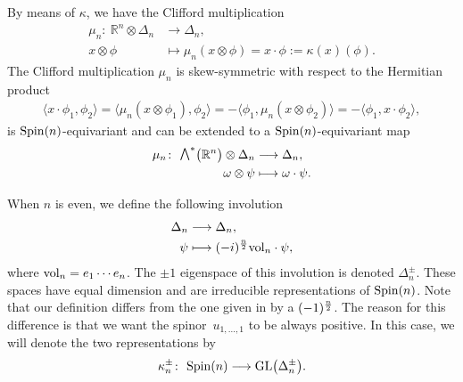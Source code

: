\documentclass[10pt,a4paper]{amsart}
\newcommand{\ext}{\raise1pt\hbox{$\textstyle\bigwedge$}}
\newcommand{\vol}{\mbox{\rm vol}}
\numberwithin{equation}{section}
\begin{document}
By means of $\kappa$, we have the Clif\/ford multiplication
\begin{align*}
\mu_n\colon \ \mathbb{R}^n\otimes \Delta_n &\longrightarrow\Delta_n, \\
x \otimes \phi &\longmapsto \mu_n(x\otimes \phi)=x\cdot\phi :=\kappa(x)(\phi) .
\end{align*}
The Clif\/ford multiplication $\mu_n$ is skew-symmetric with respect to the Hermitian product
\begin{gather*}
\langle x\cdot\phi_1 , \phi_2\rangle =\langle \mu_n(x\otimes \phi_1) , \phi_2\rangle =-\langle \phi_1 , \mu_n(x\otimes \phi_2)\rangle =-\langle \phi_1 , x\cdot \phi_2\rangle,
\end{gather*}
is ${\rm Spin}(n)$-equivariant and can be extended to a ${\rm Spin}(n)$-equivariant map
\begin{align*}
\mu_n\colon \ \ext^*\big(\mathbb{R}^n\big)\otimes \Delta_n &\longrightarrow\Delta_n,\\
\omega \otimes \psi &\longmapsto \omega\cdot\psi.
\end{align*}

When $n$ is even, we def\/ine the following involution
\begin{align*}
\Delta_n&\longrightarrow \Delta_n, \\
\psi &\longmapsto (-i)^{n\over 2}{\rm vol}_n\cdot \psi,
\end{align*}
where $\vol_n = e_1\cdots e_n$. The $\pm 1$ eigenspace of this involution is denoted $\Delta_n^\pm$. These spaces have equal dimension and are irreducible representations of ${\rm Spin}(n)$. Note that our def\/inition dif\/fers from the one given in \cite{Friedrich} by a $(-1)^{n\over 2}$. The reason for this dif\/ference is that we want the spinor~$u_{1,\dots,1}$ to be always positive. In this case, we will denote the two representations by
\begin{gather*}
\kappa_n^\pm\colon \ {\rm Spin}(n) \longrightarrow {\rm GL}\big(\Delta_n^\pm\big).
\end{gather*}
\end{document}
